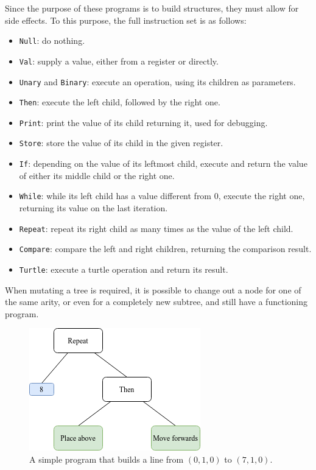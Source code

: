 \documentclass{report}
\begin{document}
Since the purpose of these programs is to build structures, they must allow for side effects. To this purpose, the full instruction set is as follows:
\begin{itemize}
    \item \verb|Null|: do nothing.
    \item \verb|Val|: supply a value, either from a register or directly.
    \item \verb|Unary| and \verb|Binary|: execute an operation, using its children as parameters.
    \item \verb|Then|: execute the left child, followed by the right one.
    \item \verb|Print|: print the value of its child returning it, used for debugging.
    \item \verb|Store|: store the value of its child in the given register.
    \item \verb|If|: depending on the value of its leftmost child, execute and return the value of either its middle child or the right one.
    \item \verb|While|: while its left child has a value different from $0$, execute the right one, returning its value on the last iteration. 
    \item \verb|Repeat|: repeat its right child as many times as the value of the left child.
    \item \verb|Compare|: compare the left and right children, returning the comparison result.
    \item \verb|Turtle|: execute a turtle operation and return its result.
\end{itemize}

When mutating a tree is required, it is possible to change out a node for one of the same arity, or even for a completely new subtree, and still have a functioning program.

\begin{figure}[ht]
    \centering
    \includegraphics[scale=0.75]{tree_2}
    \caption{A simple program that builds a line from $(0, 1, 0)$ to $(7, 1, 0)$.}
\end{figure}
\end{document}
